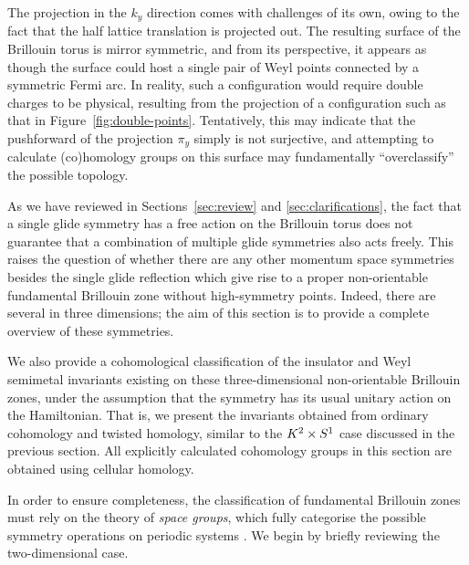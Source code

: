 The projection in the $k_y$ direction comes with challenges of its own, owing to the fact that the half lattice translation is projected out. The resulting surface of the Brillouin torus is mirror symmetric, and from its perspective, it appears as though the surface could host a single pair of Weyl points connected by a symmetric Fermi arc. In reality, such a configuration would require double charges to be physical, resulting from the projection of a configuration such as that in Figure~\ref{fig:double-points}. Tentatively, this may indicate that the pushforward of the projection $\pi_y$ simply is not surjective, and attempting to calculate (co)homology groups on this surface may fundamentally ``overclassify'' the possible topology.


 \label{sec:non-ori_classification}

As we have reviewed in Sections~\ref{sec:review} and \ref{sec:clarifications}, the fact that a single glide symmetry has a free action on the Brillouin torus does not guarantee that a combination of multiple glide symmetries also acts freely. This raises the question of whether there are any other momentum space symmetries besides the single glide reflection which give rise to a proper non-orientable fundamental Brillouin zone without high-symmetry points. Indeed, there are several in three dimensions; the aim of this section is to provide a complete overview of these symmetries. 

We also provide a cohomological classification of the insulator and Weyl semimetal invariants existing on these three-dimensional non-orientable Brillouin zones, under the assumption that the symmetry has its usual unitary action on the Hamiltonian. That is, we present the invariants obtained from ordinary cohomology and twisted homology, similar to the $K^2\times S^1$ case discussed in the previous section. All explicitly calculated cohomology groups in this section are obtained using cellular homology.

In order to ensure completeness, the classification of fundamental Brillouin zones must rely on the theory of \emph{space groups}, which fully categorise the possible symmetry operations on periodic systems \cite{ITC_A}. We begin by briefly reviewing the two-dimensional case.

